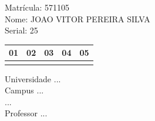 \documentclass[10pt,a4paper,twocolumn]{report}
\begin{document}
Matrícula: 571105\\ Nome: JOAO VITOR PEREIRA SILVA \\ Serial: 25\\
\begin{tabular}{|l|l|l|l|l|}\hline
01  &02  &03  &04  &05 \\ \hline 
 & & & & \\ \hline 
\end{tabular}
 \cleardoublepage 

\begin{flushleft}
Universidade ...\\
Campus ...\\
...\\
Professor ...\\
\end{flushleft}
\end{document}
